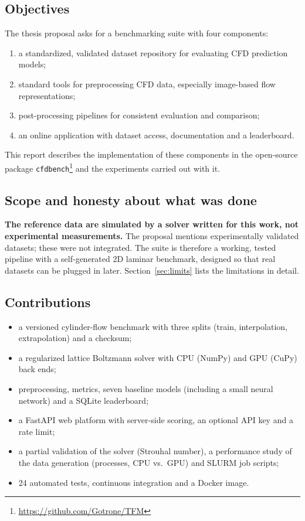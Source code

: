 \documentclass[11pt,a4paper]{article}
\begin{document}
\subsection{Objectives}
The thesis proposal asks for a benchmarking suite with four components:
\begin{enumerate}
  \item a standardized, validated dataset repository for evaluating CFD prediction models;
  \item standard tools for preprocessing CFD data, especially image-based flow representations;
  \item post-processing pipelines for consistent evaluation and comparison;
  \item an online application with dataset access, documentation and a leaderboard.
\end{enumerate}
This report describes the implementation of these components in the open-source package \texttt{cfdbench}\footnote{\url{https://github.com/Gotrone/TFM}} and the experiments carried out with it.

\subsection{Scope and honesty about what was done}
\textbf{The reference data are simulated by a solver written for this work, not experimental measurements.} The proposal mentions experimentally validated datasets; these were not integrated. The suite is therefore a working, tested pipeline with a self-generated 2D laminar benchmark, designed so that real datasets can be plugged in later. Section~\ref{sec:limits} lists the limitations in detail.

\subsection{Contributions}
\begin{itemize}
  \item a versioned cylinder-flow benchmark with three splits (train, interpolation, extrapolation) and a checksum;
  \item a regularized lattice Boltzmann solver with CPU (NumPy) and GPU (CuPy) back ends;
  \item preprocessing, metrics, seven baseline models (including a small neural network) and a SQLite leaderboard;
  \item a FastAPI web platform with server-side scoring, an optional API key and a rate limit;
  \item a partial validation of the solver (Strouhal number), a performance study of the data generation (processes, CPU vs.\ GPU) and SLURM job scripts;
  \item 24 automated tests, continuous integration and a Docker image.
\end{itemize}
\end{document}
